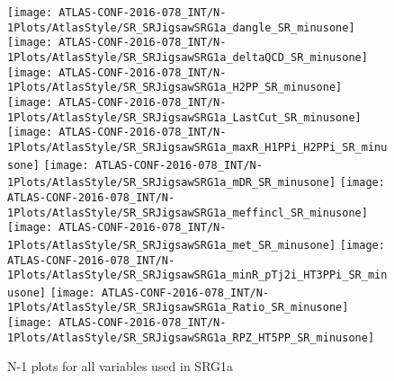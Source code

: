 \begin{figure}[tbp]
\begin{center}
\texttt{[image: ATLAS-CONF-2016-078\_INT/N-1Plots/AtlasStyle/SR\_SRJigsawSRG1a\_dangle\_SR\_minusone]}
\texttt{[image: ATLAS-CONF-2016-078\_INT/N-1Plots/AtlasStyle/SR\_SRJigsawSRG1a\_deltaQCD\_SR\_minusone]}
\texttt{[image: ATLAS-CONF-2016-078\_INT/N-1Plots/AtlasStyle/SR\_SRJigsawSRG1a\_H2PP\_SR\_minusone]}
\texttt{[image: ATLAS-CONF-2016-078\_INT/N-1Plots/AtlasStyle/SR\_SRJigsawSRG1a\_LastCut\_SR\_minusone]}
\texttt{[image: ATLAS-CONF-2016-078\_INT/N-1Plots/AtlasStyle/SR\_SRJigsawSRG1a\_maxR\_H1PPi\_H2PPi\_SR\_minusone]}
\texttt{[image: ATLAS-CONF-2016-078\_INT/N-1Plots/AtlasStyle/SR\_SRJigsawSRG1a\_mDR\_SR\_minusone]}
\texttt{[image: ATLAS-CONF-2016-078\_INT/N-1Plots/AtlasStyle/SR\_SRJigsawSRG1a\_meffincl\_SR\_minusone]}
\texttt{[image: ATLAS-CONF-2016-078\_INT/N-1Plots/AtlasStyle/SR\_SRJigsawSRG1a\_met\_SR\_minusone]}
\texttt{[image: ATLAS-CONF-2016-078\_INT/N-1Plots/AtlasStyle/SR\_SRJigsawSRG1a\_minR\_pTj2i\_HT3PPi\_SR\_minusone]}
\texttt{[image: ATLAS-CONF-2016-078\_INT/N-1Plots/AtlasStyle/SR\_SRJigsawSRG1a\_Ratio\_SR\_minusone]}
\texttt{[image: ATLAS-CONF-2016-078\_INT/N-1Plots/AtlasStyle/SR\_SRJigsawSRG1a\_RPZ\_HT5PP\_SR\_minusone]}
\end{center}
\caption{N-1 plots for all variables used in SRG1a}
\label{fig:SR_SRJigsawSRG1a_maxR_H1PPi_H2PPi_SR_minusone}
\end{figure}


